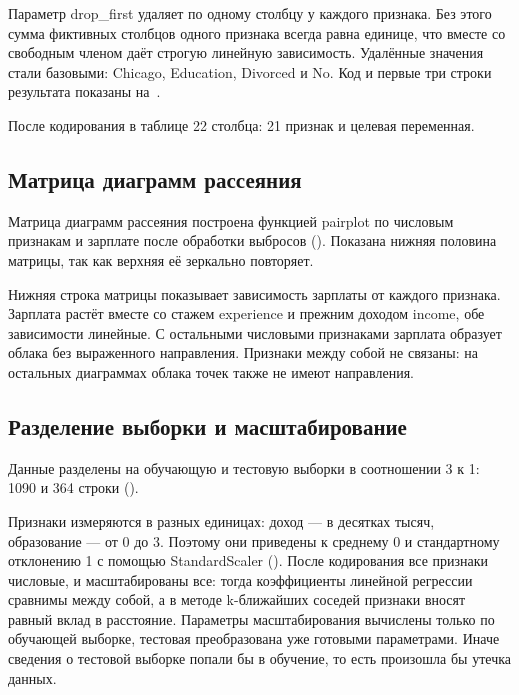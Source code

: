 \documentclass[a4paper,14pt]{extarticle}
\begin{document}
Параметр drop\_first удаляет по одному столбцу у каждого признака. Без этого сумма фиктивных столбцов одного признака всегда равна единице, что вместе со свободным членом даёт строгую линейную зависимость. Удалённые значения стали базовыми: Chicago, Education, Divorced и No. Код и первые три строки результата показаны на~.


После кодирования в таблице 22 столбца: 21 признак и целевая переменная.

\subsection{Матрица диаграмм рассеяния}

Матрица диаграмм рассеяния построена функцией pairplot по числовым признакам и зарплате после обработки выбросов (). Показана нижняя половина матрицы, так как верхняя её зеркально повторяет.


Нижняя строка матрицы показывает зависимость зарплаты от каждого признака. Зарплата растёт вместе со стажем experience и прежним доходом income, обе зависимости линейные. С остальными числовыми признаками зарплата образует облака без выраженного направления. Признаки между собой не связаны: на остальных диаграммах облака точек также не имеют направления.

\subsection{Разделение выборки и масштабирование}

Данные разделены на обучающую и тестовую выборки в соотношении 3 к 1: 1090 и 364 строки ().


Признаки измеряются в разных единицах: доход — в десятках тысяч, образование — от 0 до 3. Поэтому они приведены к среднему 0 и стандартному отклонению 1 с помощью StandardScaler (). После кодирования все признаки числовые, и масштабированы все: тогда коэффициенты линейной регрессии сравнимы между собой, а в методе k-ближайших соседей признаки вносят равный вклад в расстояние. Параметры масштабирования вычислены только по обучающей выборке, тестовая преобразована уже готовыми параметрами. Иначе сведения о тестовой выборке попали бы в обучение, то есть произошла бы утечка данных.
\end{document}

